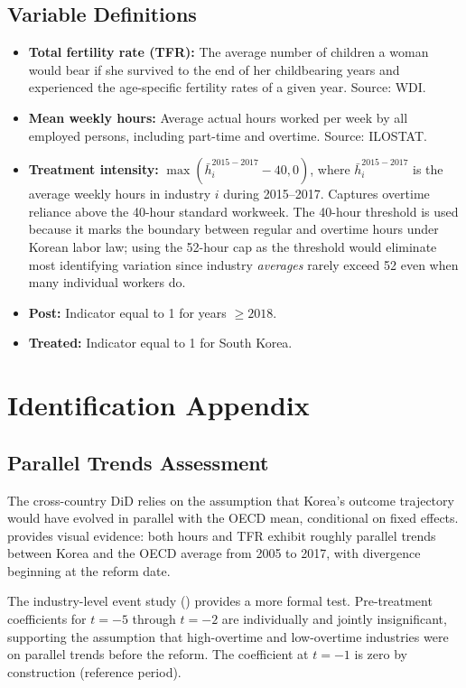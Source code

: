 \documentclass[12pt]{article}
\begin{document}
\subsection{Variable Definitions}

\begin{itemize}
\item \textbf{Total fertility rate (TFR):} The average number of children a woman would bear if she survived to the end of her childbearing years and experienced the age-specific fertility rates of a given year. Source: WDI.
\item \textbf{Mean weekly hours:} Average actual hours worked per week by all employed persons, including part-time and overtime. Source: ILOSTAT.
\item \textbf{Treatment intensity:} $\max(\bar{h}_i^{2015-2017} - 40, 0)$, where $\bar{h}_i^{2015-2017}$ is the average weekly hours in industry $i$ during 2015--2017. Captures overtime reliance above the 40-hour standard workweek. The 40-hour threshold is used because it marks the boundary between regular and overtime hours under Korean labor law; using the 52-hour cap as the threshold would eliminate most identifying variation since industry \textit{averages} rarely exceed 52 even when many individual workers do.
\item \textbf{Post:} Indicator equal to 1 for years $\geq 2018$.
\item \textbf{Treated:} Indicator equal to 1 for South Korea.
\end{itemize}


\section{Identification Appendix}
\label{sec:id_appendix}

\subsection{Parallel Trends Assessment}

The cross-country DiD relies on the assumption that Korea's outcome trajectory would have evolved in parallel with the OECD mean, conditional on fixed effects.  provides visual evidence: both hours and TFR exhibit roughly parallel trends between Korea and the OECD average from 2005 to 2017, with divergence beginning at the reform date.

The industry-level event study () provides a more formal test. Pre-treatment coefficients for $t = -5$ through $t = -2$ are individually and jointly insignificant, supporting the assumption that high-overtime and low-overtime industries were on parallel trends before the reform. The coefficient at $t = -1$ is zero by construction (reference period).
\end{document}
